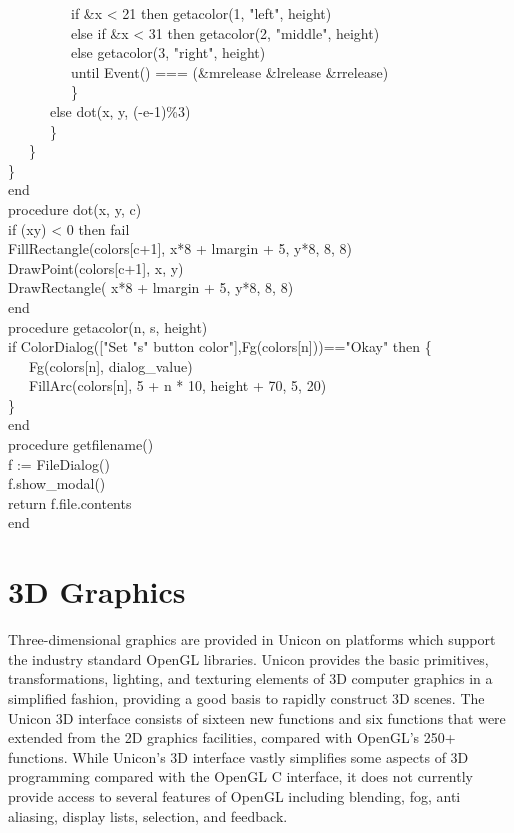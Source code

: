 {\>   \ \ \ \ \ \ \ \ \ if \&x {\textless} 21 then getacolor(1,
"left", height) \\
\>   \ \ \ \ \ \ \ \ \ else if \&x {\textless} 31 then getacolor(2,
"middle", height) \\
\>   \ \ \ \ \ \ \ \ \ else getacolor(3,
"right", height) \\
\>   \ \ \ \ \ \ \ \ \ until Event() === (\&mrelease {\textbar}
\&lrelease{\textbar} \&rrelease) \\
\>   \ \ \ \ \ \ \ \ \ \} \\
\>   \ \ \ \ \ \ else dot(x, y, (-e-1)\%3) \\
\>   \ \ \ \ \ \ \} \\
\>   \ \ \ \} \\
\>   \} \\
end
\ \\
procedure dot(x, y, c) \\
\>   if (x{\textbar}y) {\textless} 0 then fail \\
\>   FillRectangle(colors[c+1], x*8 + lmargin + 5, y*8, 8, 8) \\
\>   DrawPoint(colors[c+1], x, y) \\
\>   DrawRectangle( x*8 + lmargin + 5, y*8, 8, 8) \\
end
\ \\
procedure getacolor(n, s, height) \\
\>   if ColorDialog(["Set
"{\textbar}{\textbar}s{\textbar}{\textbar}"
button color"],Fg(colors[n]))=="Okay" then \{ \\
\>   \ \ \ Fg(colors[n], dialog\_value) \\
\>   \ \ \ FillArc(colors[n], 5 + n * 10, height + 70, 5, 20) \\
\>   \} \\
end
\ \\
procedure getfilename() \\
\>   f := FileDialog() \\
\>   f.show\_modal() \\
\>   return f.file.contents \\
end
}

\section{3D Graphics}

Three-dimensional graphics are provided in Unicon on platforms which
support the industry standard OpenGL libraries. Unicon provides the
basic primitives, transformations, lighting, and texturing elements of
3D computer graphics in a simplified fashion, providing a good basis
to rapidly construct 3D scenes. The Unicon 3D interface consists of
sixteen new functions and six functions that were extended from the 2D
graphics facilities, compared with OpenGL's 250+ functions. While
Unicon's 3D interface vastly simplifies some aspects of 3D programming
compared with the OpenGL C interface, it does not currently provide
access to several features of OpenGL including blending, fog, anti
aliasing, display lists, selection, and feedback.

